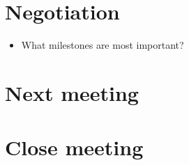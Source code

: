 \documentclass[11pt, a4paper]{article}
\begin{document}
\section{Negotiation}
\begin{itemize}
	\item What milestones are most important?
\end{itemize}

\section{Next meeting}

\section {Close meeting}
\vspace*{10pt}
\end{document}
